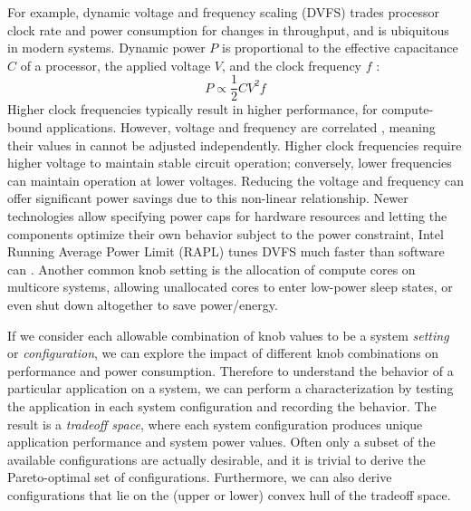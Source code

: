 For example, dynamic voltage and frequency scaling (DVFS) trades processor clock rate and power consumption for changes in throughput, and is ubiquitous in modern systems.
Dynamic power $P$ is proportional to the effective capacitance $C$ of a processor, the applied voltage $V$, and the clock frequency $f$ \cite{Hennessy:2003:CAQ:861856}:
\begin{equation}
P \propto \frac{1}{2}CV^2f
\label{eqn:bg-power}
\end{equation}
Higher clock frequencies typically result in higher performance, \eg for compute-bound applications.
However, voltage and frequency are correlated \cite{LeSueur2010}, meaning their values in  cannot be adjusted independently.
Higher clock frequencies require higher voltage to maintain stable circuit operation; conversely, lower frequencies can maintain operation at lower voltages.
Reducing the voltage and frequency can offer significant power savings due to this non-linear relationship.
Newer technologies allow specifying power caps for hardware resources and letting the components optimize their own behavior subject to the power constraint, \eg Intel Running Average Power Limit (RAPL) tunes DVFS much faster than software can \cite{RAPL}.
Another common knob setting is the allocation of compute cores on multicore systems, allowing unallocated cores to enter low-power sleep states, or even shut down altogether to save power/energy.

If we consider each allowable combination of knob values to be a system \emph{setting} or \emph{configuration}, we can explore the impact of different knob combinations on performance and power consumption.
Therefore to understand the behavior of a particular application on a system, we can perform a characterization by testing the application in each system configuration and recording the behavior.
The result is a \emph{tradeoff space}, where each system configuration produces unique application performance and system power values.
Often only a subset of the available configurations are actually desirable, and it is trivial to derive the Pareto-optimal set of configurations.
Furthermore, we can also derive configurations that lie on the (upper or lower) convex hull of the tradeoff space.


